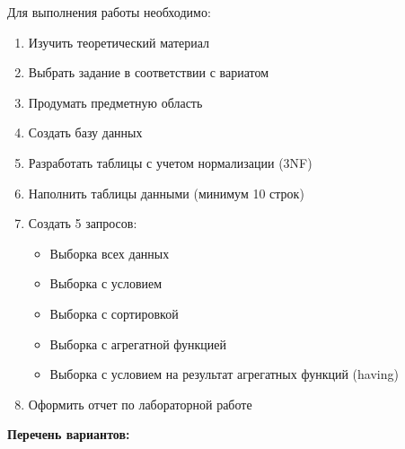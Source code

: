 \documentclass[a4paper]{article}
\begin{document}
Для выполнения работы необходимо:
\begin{enumerate}
  \item Изучить теоретический материал
  \item Выбрать задание в соответствии с вариатом
  \item Продумать предметную область
  \item Создать базу данных
  \item Разработать таблицы с учетом нормализации (3NF)
  \item Наполнить таблицы данными (минимум 10 строк)
   \item Создать 5 запросов:
    \begin{itemize}
      \item Выборка всех данных
      \item Выборка с условием
      \item Выборка с сортировкой
      \item Выборка с агрегатной функцией
      \item Выборка с условием на результат агрегатных функций (having)
    \end{itemize}
  \item Оформить отчет по лабораторной работе
\end{enumerate}

\textbf{Перечень вариантов:}
\end{document}
